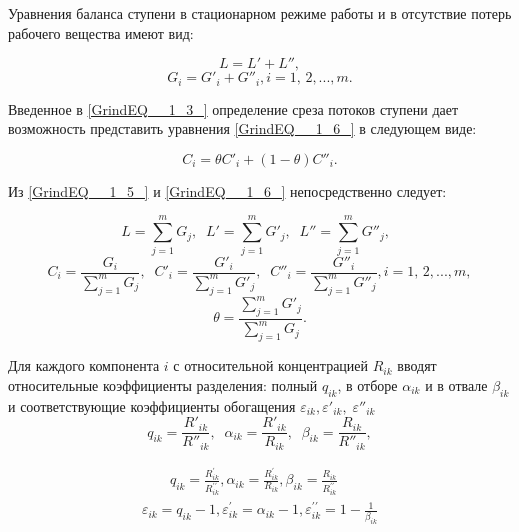 Уравнения баланса ступени в стационарном режиме работы и в отсутствие потерь рабочего вещества имеют вид:

\begin{equation} \label{GrindEQ__1_5_} 
  L=L'+L'', 
  \end{equation} 
  \begin{equation} \label{GrindEQ__1_6_} 
  G_{i} =G'_{i} +G''_{i} , i=1,\, 2,...,m.             
  \end{equation} 
  

Введенное в \ref{GrindEQ__1_3_} определение среза потоков ступени дает возможность представить уравнения \ref{GrindEQ__1_6_} в следующем виде:

\begin{equation} \label{GrindEQ__1_7_} 
  C_{i} =\theta C'_{i} +(1-\theta )C''_{i} . 
\end{equation} 

Из \ref{GrindEQ__1_5_} и \ref{GrindEQ__1_6_} непосредственно следует:

\begin{equation} \label{GrindEQ__1_8_} 
  L=\sum _{j=1}^{m}G_{j}  ,\; \; L'=\sum _{j=1}^{m}G'_{j} ,\; \;  L''=\sum _{j=1}^{m}G''_{j} ,\; \;   
  \end{equation} 
  \begin{equation} \label{GrindEQ__1_9_} 
  C_{i} =\frac{G_{i} }{\sum _{j=1}^{m}G_{j}  } ,\; \; C'_{i} =\frac{G'_{i} }{\sum _{j=1}^{m}G'_{j}  } ,\; \; C''_{i} =\frac{G''_{i} }{\sum _{j=1}^{m}G''_{j}  } , i=1,\, 2,...,m,             
  \end{equation} 
  \begin{equation} \label{GrindEQ__1_10_} 
  \theta =\frac{\sum _{j=1}^{m}G'_{j}  }{\sum _{j=1}^{m}G_{j}  } .            
\end{equation} 

Для каждого компонента $i$ с относительной концентрацией $R_{ik}$ вводят относительные коэффициенты разделения: полный $q_{ik}$, в отборе $\alpha _{ik} $ и в отвале $\beta _{ik} $ и соответствующие коэффициенты обогащения $\varepsilon _{ik} ,\varepsilon '_{ik} ,\; \varepsilon ''_{ik} \; $
\[q_{ik} =\frac{R'_{ik} }{R''_{ik} } ,\; \; \alpha _{ik} =\frac{R'_{ik} }{R_{ik} } ,\; \; \beta _{ik} =\frac{R_{ik} }{R''_{ik} } ,\] 

\begin{equation} \label{GrindEQ__1_11_} 
  \begin{array}{l}
    \qquad q_{i k}=\frac{R_{i k}^{\prime}}{R_{i k}^{\prime \prime}}, \alpha_{i k}=\frac{R_{i k}^{\prime}}{R_{i k}}, \beta_{i k}=\frac{R_{i k}}{R_{i k}^{\prime \prime}} \\
    \varepsilon_{i k}=q_{i k}-1, \varepsilon_{i k}^{\prime}=\alpha_{i k}-1, \varepsilon_{i k}^{\prime \prime}=1-\frac{1}{\beta_{i k}}
    \end{array}
\end{equation} 

